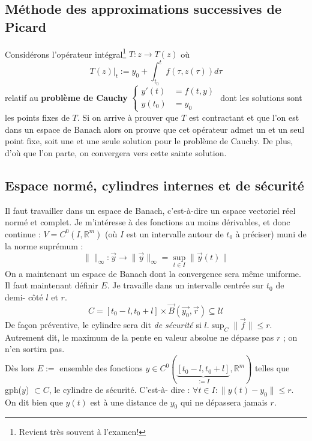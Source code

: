 	\subsection{Méthode des approximations successives de Picard}
	Considérons l'opérateur intégral\footnote{Revient très souvent à l'examen!} $T : 
	z\rightarrow T(z)$ où 
	\begin{equation}
	T(z)|_t := y_0 + \int_{t_0}^t f(\tau,z(\tau))d\tau
	\end{equation}
	relatif au \textbf{problème de Cauchy} $\left\{\begin{array}{ll}
	y'(t) &= f(t,y)\\
	y(t_0) &= y_0
	\end{array}\right.$ dont les solutions sont les points fixes de $T$. Si on arrive 
	à prouver que $T$ est contractant et que l'on est dans un espace de Banach alors 
	on prouve que cet opérateur admet un et un seul point fixe, soit une et une seule 
	solution pour le problème de Cauchy. De plus, d'où que l'on parte, on convergera 
	vers cette sainte solution.
	
	\subsection{Espace normé, cylindres internes et de sécurité}
	Il faut travailler dans un espace de Banach, c'est-à-dire un espace vectoriel 
	réel normé et complet. Je m'intéresse à des fonctions au moins dérivables, et 
	donc continue : $V = C^0(I,\mathbb{R}^m)$ (où $I$ est un intervalle autour de $t_0$ 
	à préciser) muni de la norme suprémum :
	\begin{equation}
	\| \|_\infty : \vec{y} \rightarrow \|\vec{y}\|_\infty = \sup_{t\in I}\|\vec{y}(t)
	\|
	\end{equation}
	On a maintenant un espace de Banach dont la convergence sera même uniforme. Il faut 
	maintenant définir $E$. Je travaille dans un intervalle centrée sur $t_0$ de demi-
	côté $l$ et $r$. 
	\begin{equation}
	C = [t_0-l, t_0+l]\times\vec{B}(\vec{y_0},\vec{r}) \subseteq \mathcal{U}
	\end{equation}
	De façon préventive, le cylindre sera dit \textit{de sécurité} si $l.\sup_C \|\vec{f}
	\| \leq r$. Autrement dit, le maximum de la pente en valeur absolue ne dépasse pas 
	$r$ ; on n'en sortira pas.\\
	
	Dès lors $E :=$ ensemble des fonctions $y\in C^0(\underbrace{[t_0-l,t_0+l]}_{:= I}, 
	\mathbb{R}^m)$ telles que gph($y$) $\subset C$, le cylindre de sécurité. C'est-à-
	dire : $\forall t \in I : \| y(t) - y_0\| \leq r$. On dit bien que $y(t)$ est à une 
	distance de $y_0$ qui ne dépassera jamais $r$.
	
